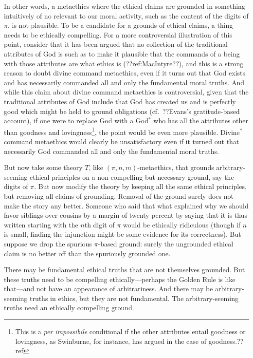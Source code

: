 In other words, a metaethics where the ethical claims are grounded in something intuitively of no relevant to our moral activity, such as the content of the
digits of $\pi$, is not plausible. To be a candidate for a grounds of ethical claims, a thing needs to be ethically compelling. For a more controversial
illustration of this point, consider that it has been argued that no collection of the traditional attributes of God is such 
as to make it plausible that the commands of a being with those attributes are what ethics is (??ref:MacIntyre??), and this is a strong reason to doubt divine
command metaethics, even if it turns out that God exists and has necessarily commanded all and only the fundamental moral
truths.  And while this claim about divine command metaethics is controversial, given that the traditional attributes of 
God include that God has created us and is perfectly good which might be held to ground obligations (cf.\ ??Evans's
gratitude-based account), if one were to replace God with a God$^*$ who has all the attributes other than goodness and lovingness\footnote{This is a \textit{per impossibile} conditional if the other attributes entail goodness or lovingness, as Swinburne, for instance, has argued in the case of goodness.??ref}, the point would be even more plausible. Divine$^*$ command metaethics would clearly be unsatisfactory
even if it turned out that necessarily God commanded all and only the fundamental moral truths.

But now take some theory $T$, like $(\pi,n,m)$-metaethics, that  grounds arbitrary-seeming ethical principles on 
a non-compelling but necessary ground, say the digits of $\pi$. But now modify the theory by keeping all the same
ethical principles, but removing all claims of grounding.  Removal
of the ground surely does not make the story any better. Someone who said that what explained why we should favor siblings over cousins by a margin of
twenty percent by saying that it is thus written starting with the $n$th digit of $\pi$ would be ethically ridiculous (though if $n$ is small, finding
the injunction might be some evidence for its correctness). But suppose we drop the spurious $\pi$-based ground: surely the ungrounded ethical claim is no better off than the spuriously grounded one. 

There may be fundamental ethical truths that are not themselves grounded. But these truths need to be compelling ethically---perhaps the Golden Rule is like that---and not 
have an appearance of arbitrariness. And there may be arbitrary-seeming truths in ethics, but they are not 
fundamental. The arbitrary-seeming truths need an ethically compelling ground.


